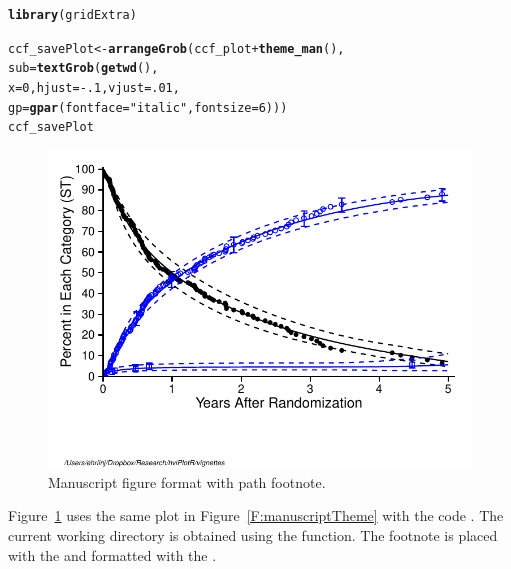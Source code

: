\documentclass[nojss, letterpaper]{jss}\usepackage[]{graphicx}\usepackage[]{color}
\makeatletter
\def\maxwidth{ %
  \ifdim\Gin@nat@width>\linewidth
    \linewidth
  \else
    \Gin@nat@width
  \fi
}
\newcommand{\hlnum}[1]{\textcolor[rgb]{0.686,0.059,0.569}{#1}}%
\newcommand{\hlstr}[1]{\textcolor[rgb]{0.192,0.494,0.8}{#1}}%
\newcommand{\hlopt}[1]{\textcolor[rgb]{0,0,0}{#1}}%
\newcommand{\hlstd}[1]{\textcolor[rgb]{0.345,0.345,0.345}{#1}}%
\newcommand{\hlkwb}[1]{\textcolor[rgb]{0.69,0.353,0.396}{#1}}%
\newcommand{\hlkwc}[1]{\textcolor[rgb]{0.333,0.667,0.333}{#1}}%
\newcommand{\hlkwd}[1]{\textcolor[rgb]{0.737,0.353,0.396}{\textbf{#1}}}%
\newenvironment{kframe}{%
 \def\at@end@of@kframe{}%
 \ifinner\ifhmode%
  \def\at@end@of@kframe{\end{minipage}}%
  \begin{minipage}{\columnwidth}%
 \fi\fi%
 \def\FrameCommand##1{\hskip\@totalleftmargin \hskip-\fboxsep
 \colorbox{shadecolor}{##1}\hskip-\fboxsep
     \hskip-\linewidth \hskip-\@totalleftmargin \hskip\columnwidth}%
 \MakeFramed {\advance\hsize-\width
   \@totalleftmargin\z@ \linewidth\hsize
   \@setminipage}}%
 {\par\unskip\endMakeFramed%
 \at@end@of@kframe}
\newenvironment{knitrout}{}{} %
\makeatother
\begin{document}
\begin{knitrout}\footnotesize
{}\color{fgcolor}\begin{kframe}
\begin{alltt}
\hlkwd{library}\hlstd{(gridExtra)}

\hlstd{ccf_savePlot} \hlkwb{<-} \hlkwd{arrangeGrob}\hlstd{(ccf_plot}\hlopt{+}\hlkwd{theme_man}\hlstd{(),}
                            \hlkwc{sub} \hlstd{=} \hlkwd{textGrob}\hlstd{(}\hlkwd{getwd}\hlstd{(),}
                                           \hlkwc{x} \hlstd{=} \hlnum{0}\hlstd{,} \hlkwc{hjust} \hlstd{=} \hlopt{-}\hlnum{.1}\hlstd{,} \hlkwc{vjust}\hlstd{=}\hlnum{.01}\hlstd{,}
                                           \hlkwc{gp} \hlstd{=} \hlkwd{gpar}\hlstd{(}\hlkwc{fontface} \hlstd{=} \hlstr{"italic"}\hlstd{,} \hlkwc{fontsize} \hlstd{=} \hlnum{6}\hlstd{)))}
\hlstd{ccf_savePlot}
\end{alltt}
\end{kframe}\begin{figure}[htpb]


{\centering \includegraphics[width=\maxwidth]{figure/beamer-manuscriptFootnote} 

}

\caption[Manuscript figure format with path footnote]{Manuscript figure format with path footnote.\label{F:manuscriptFootnote}}
\end{figure}


\end{knitrout}
Figure~\ref{F:manuscriptFootnote} uses the same plot in Figure~\ref{F:manuscriptTheme} with the code . The current working directory is obtained using the  function. The footnote is placed with the  and formatted with the .
\end{document}
